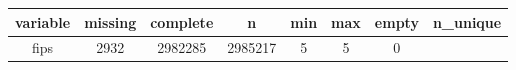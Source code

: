 \documentclass[]{book}
\theoremstyle{definition}
\theoremstyle{definition}
\theoremstyle{definition}
\theoremstyle{remark}
\begin{document}
\begin{longtable}[]{@{}cccccccc@{}}
\toprule
\begin{minipage}[b]{0.23\columnwidth}\centering\strut
variable\strut
\end{minipage} & \begin{minipage}[b]{0.09\columnwidth}\centering\strut
missing\strut
\end{minipage} & \begin{minipage}[b]{0.10\columnwidth}\centering\strut
complete\strut
\end{minipage} & \begin{minipage}[b]{0.09\columnwidth}\centering\strut
n\strut
\end{minipage} & \begin{minipage}[b]{0.05\columnwidth}\centering\strut
min\strut
\end{minipage} & \begin{minipage}[b]{0.05\columnwidth}\centering\strut
max\strut
\end{minipage} & \begin{minipage}[b]{0.07\columnwidth}\centering\strut
empty\strut
\end{minipage} & \begin{minipage}[b]{0.09\columnwidth}\centering\strut
n\_unique\strut
\end{minipage}\tabularnewline
\midrule
\endhead
\begin{minipage}[t]{0.23\columnwidth}\centering\strut
fips\strut
\end{minipage} & \begin{minipage}[t]{0.09\columnwidth}\centering\strut
2932\strut
\end{minipage} & \begin{minipage}[t]{0.10\columnwidth}\centering\strut
2982285\strut
\end{minipage} & \begin{minipage}[t]{0.09\columnwidth}\centering\strut
2985217\strut
\end{minipage} & \begin{minipage}[t]{0.05\columnwidth}\centering\strut
5\strut
\end{minipage} & \begin{minipage}[t]{0.05\columnwidth}\centering\strut
5\strut
\end{minipage} & \begin{minipage}[t]{0.07\columnwidth}\centering\strut
0\strut
\end{minipage} & \begin{minipage}[t]{0.09\columnwidth}\centering\strut

\end{minipage}
\end{longtable}
\end{document}
